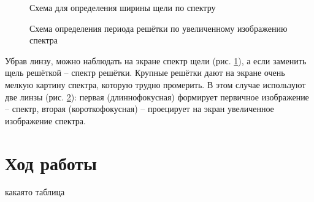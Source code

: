 \documentclass[a5paper,10pt, twoside]{article} %
\begin{document}
	\begin{figure}[h]
		\caption{Схема для определения ширины щели по спектру}
		\label{ris:spectrum}
	\end{figure}
	
	\begin{figure}[h]
		\caption{Схема определения периода решётки по увеличенному изображению спектра}
		\label{ris:d_per}
	\end{figure}
	
	Убрав линзу, можно наблюдать на экране спектр щели (рис. \ref{ris:spectrum}), а если заменить щель решёткой -- спектр решётки. Крупные решётки дают на экране очень мелкую картину спектра, которую трудно промерить. В этом случае используют две линзы (рис. \ref{ris:d_per}): первая (длиннофокусная) формирует первичное изображение -- спектр, вторая (короткофокусная) -- проецирует на экран увеличенное изображение спектра.

	


\section{Ход работы}

\begin{table}[h!]
	\caption{какаято таблица}
\end{table}
\end{document}
